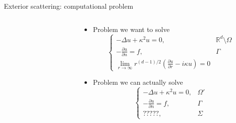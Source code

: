 \documentclass{beamer}
\begin{document}
\begin{frame}{Exterior scattering: computational problem}
    \begin{columns}
    \begin{column}{0.45\textwidth}
        \begin{figure}[ht]
        \begin{center}
        \end{center}
        \end{figure}
    \end{column}
    \begin{column}{0.55\textwidth}
        \begin{itemize}
            \item<1-> Problem we want to solve
            \[
                \begin{cases}
                    -\Delta u + \kappa^2 u = 0, &  \mathbb R^d\setminus\Omega \\
                    -\frac{\partial u}{\partial n} = f, & \Gamma \\
                    \lim_{r\to\infty} r^{(d-1)/2}
                        \left(\tfrac{\partial u}{\partial r} - i\kappa u\right)
                = 0
                \end{cases}
            \]
            \item<2-> Problem we can actually solve
            \[
                \begin{cases}
                    -\Delta u + \kappa^2 u = 0, & \Omega' \\
                    -\frac{\partial u}{\partial n} = f, & \Gamma \\
                    ?????, & \Sigma
                \end{cases}
            \]
        \end{itemize}
    \end{column}
    \end{columns}
\end{frame}
\end{document}
